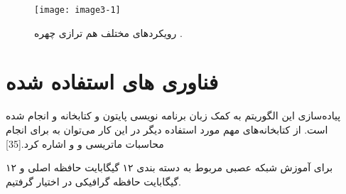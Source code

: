 \begin{figure}[h]
\centering
  \texttt{[image: image3-1]}
  \caption{رویکردهای مختلف هم ترازی چهره \cite{ref1}.}
  \label{image2-1}
\end{figure}

\section{فناوری های استفاده شده}
پیاده‌سازی این الگوریتم به کمک زبان برنامه‌ نویسی پایتون و کتابخانه  و انجام شده است. از کتابخانه‌های مهم مورد استفاده دیگر در این کار می‌‌توان به  برای انجام محاسبات ماتریسی و  و  اشاره کرد.[35] 

برای آموزش شبکه عصبی مربوط به دسته بندی ۱۲ گیگابایت حافظه اصلی و ۱۲ گیگابایت حافظه گرافیکی در اختیار گرفتیم.

